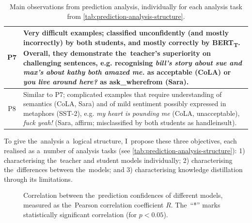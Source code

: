 \documentclass[bsc,frontabs,singlespacing,parskip,deptreport]{infthesis}
\def\BERTT{BERT\textsubscript{T}}
\begin{document}
{{\begin{table}[h!b]
{\begin{tabular}{|c|m{15cm}|}
      \\ \hline
      P7 &
      Very difficult examples; classified unconfidently (and mostly incorrectly) by both students, and mostly correctly by \BERTT.
      Overall, they demonstrate the~teacher's superiority on challenging sentences, e.g. recognising \textit{bill's story about sue and max's about kathy both amazed me.} as acceptable (CoLA) or \textit{you live around here?} as ask\_wherefrom (Sara).
      \\ \hline
      P8 &
      Similar to P7; complicated examples that require understanding of semantics (CoLA, Sara) and of mild sentiment possibly expressed in metaphors (SST-2), e.g.
      \textit{my heart is pounding me} (CoLA, unacceptable), \textit{fuck yeah!} (Sara, affirm; misclassified by both students as handleinsult).
      \\ \hline
      \end{tabular}}
      \caption{Main observations from prediction analysis, individually for each analysis task from \autoref{tab:prediction-analysis-structure}.}
      \label{tab:prediction-analysis-findings}
    \end{table}

    To give the~analysis a~logical structure, I~propose these three objectives, each realised as a~number of analysis tasks (see \autoref{tab:prediction-analysis-structure}):
    1) characterising the~teacher and student models individually;
    2) characterising the~differences between the~models;
    and 3) characterising knowledge distillation through its limitations.
    
    \begin{figure}[h!tb]
      \centering
      \caption{Correlation between the~prediction confidences of different models, measured as the~Pearson correlation coefficient $R$. The~``*'' marks statistically significant correlation (for $p < 0.05$).}
      \label{fig:confidence-correlation}
    \end{figure}

}}
\end{document}
